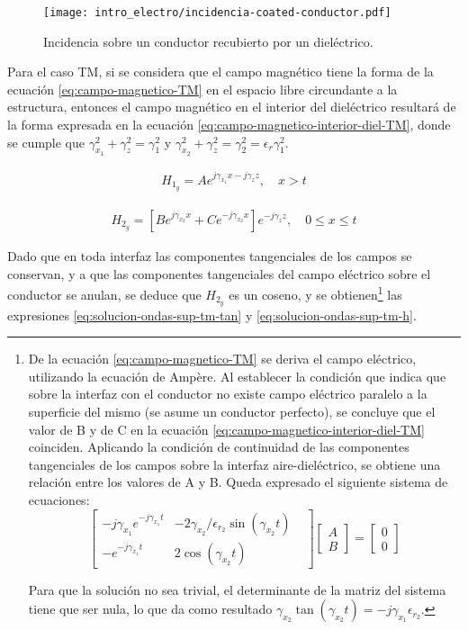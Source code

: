 \begin{figure}[htp]
	\centering
	\texttt{[image: intro\_electro/incidencia-coated-conductor.pdf]}
	\caption{Incidencia sobre un conductor recubierto por un dieléctrico.}
	\label{fig:thin-dielectric-coating}
\end{figure}

Para el caso TM, si se considera que el campo magnético tiene la forma de la ecuación \ref{eq:campo-magnetico-TM} en el espacio libre circundante a la estructura, entonces el campo magnético en el interior del dieléctrico resultará de la forma expresada en la ecuación \ref{eq:campo-magnetico-interior-diel-TM}, donde se cumple que $\gamma_{x_1}^2 + \gamma_z^2 = \gamma_1^2$ y $\gamma_{x_2}^2 + \gamma_z^2 = \gamma_2^2 = \epsilon_r \gamma_1^2$.

\begin{align}
	\label{eq:campo-magnetico-TM}
	H_{1_y} = A e^{j\gamma_{x_1} x - j \gamma_z z},\quad x>t
\end{align}

\begin{align}
	\label{eq:campo-magnetico-interior-diel-TM}
	H_{2_y} = [B e^{j\gamma_{x_2} x} + C e^{-j\gamma_{x_2} x}] e^{-j\gamma_z z},\quad  0\leq x \leq t
\end{align}

Dado que en toda interfaz las componentes tangenciales de los campos se conservan, y a que las componentes tangenciales del campo eléctrico sobre el conductor se anulan, se deduce que $H_{2_y}$ es un coseno, y se obtienen\footnote{De la ecuación \ref{eq:campo-magnetico-TM} se deriva el campo eléctrico, utilizando la ecuación de Ampère. Al establecer la condición que indica que sobre la interfaz con el conductor no existe campo eléctrico paralelo a la superficie del mismo (se asume un conductor perfecto), se concluye que el valor de B y de C en la ecuación \ref{eq:campo-magnetico-interior-diel-TM} coinciden. Aplicando la condición de continuidad de las componentes tangenciales de los campos sobre la interfaz aire-dieléctrico, se obtiene una relación entre los valores de A y B. Queda expresado el siguiente sistema de ecuaciones:
\begin{equation*}
	\begin{bmatrix}
		-j \gamma_{x_1} e^{-j \gamma_{x_1} t} & -2 \gamma_{x_2}/\epsilon_{r_2} \sin(\gamma_{x_2} t) &  \\
		 -e^{-j \gamma_{x_1} t} & 2 \cos (\gamma_{x_2} t)
	\end{bmatrix}
	\begin{bmatrix}
		A \\
		B
	\end{bmatrix}
	=
	\begin{bmatrix}
		0 \\
		0
	\end{bmatrix}
\end{equation*}

Para que la solución no sea trivial, el determinante de la matriz del sistema tiene que ser nula, lo que da como resultado $\gamma_{x_2} \tan (\gamma_{x_2} t) = -j \gamma_{x_1} \epsilon_{r_2}$.
} las expresiones \ref{eq:solucion-ondas-sup-tm-tan} y \ref{eq:solucion-ondas-sup-tm-h}.



